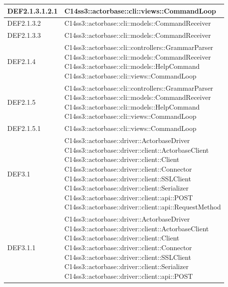 \documentclass{scalatekids-article}
\begin{document}
\begin{longtable}[H]{|p{4.5cm}|p{13cm}|}
\hline
DEF2.1.3.1.2.1 & \multiLineCell[t]{C14ss3::actorbase::cli::views::CommandLoop\\}\\
\hline
DEF2.1.3.2 & \multiLineCell[t]{C14ss3::actorbase::cli::models::CommandReceiver\\}\\
\hline
DEF2.1.3.3 & \multiLineCell[t]{C14ss3::actorbase::cli::models::CommandReceiver\\}\\
\hline
DEF2.1.4 & \multiLineCell[t]{C14ss3::actorbase::cli::controllers::GrammarParser\\C14ss3::actorbase::cli::models::CommandReceiver\\C14ss3::actorbase::cli::models::HelpCommand\\C14ss3::actorbase::cli::views::CommandLoop\\}\\
\hline
DEF2.1.5 & \multiLineCell[t]{C14ss3::actorbase::cli::controllers::GrammarParser\\C14ss3::actorbase::cli::models::CommandReceiver\\C14ss3::actorbase::cli::models::HelpCommand\\C14ss3::actorbase::cli::views::CommandLoop\\}\\
\hline
DEF2.1.5.1 & \multiLineCell[t]{C14ss3::actorbase::cli::views::CommandLoop\\}\\
\hline
DEF3.1 & \multiLineCell[t]{C14ss3::actorbase::driver::ActorbaseDriver\\C14ss3::actorbase::driver::client::ActorbaseClient\\C14ss3::actorbase::driver::client::Client\\C14ss3::actorbase::driver::client::Connector\\C14ss3::actorbase::driver::client::SSLClient\\C14ss3::actorbase::driver::client::Serializer\\C14ss3::actorbase::driver::client::api::POST\\C14ss3::actorbase::driver::client::api::RequestMethod\\}\\
\hline
DEF3.1.1 & \multiLineCell[t]{C14ss3::actorbase::driver::ActorbaseDriver\\C14ss3::actorbase::driver::client::ActorbaseClient\\C14ss3::actorbase::driver::client::Client\\C14ss3::actorbase::driver::client::Connector\\C14ss3::actorbase::driver::client::SSLClient\\C14ss3::actorbase::driver::client::Serializer\\C14ss3::actorbase::driver::client::api::POST\\}\\

\end{longtable}
\end{document}
